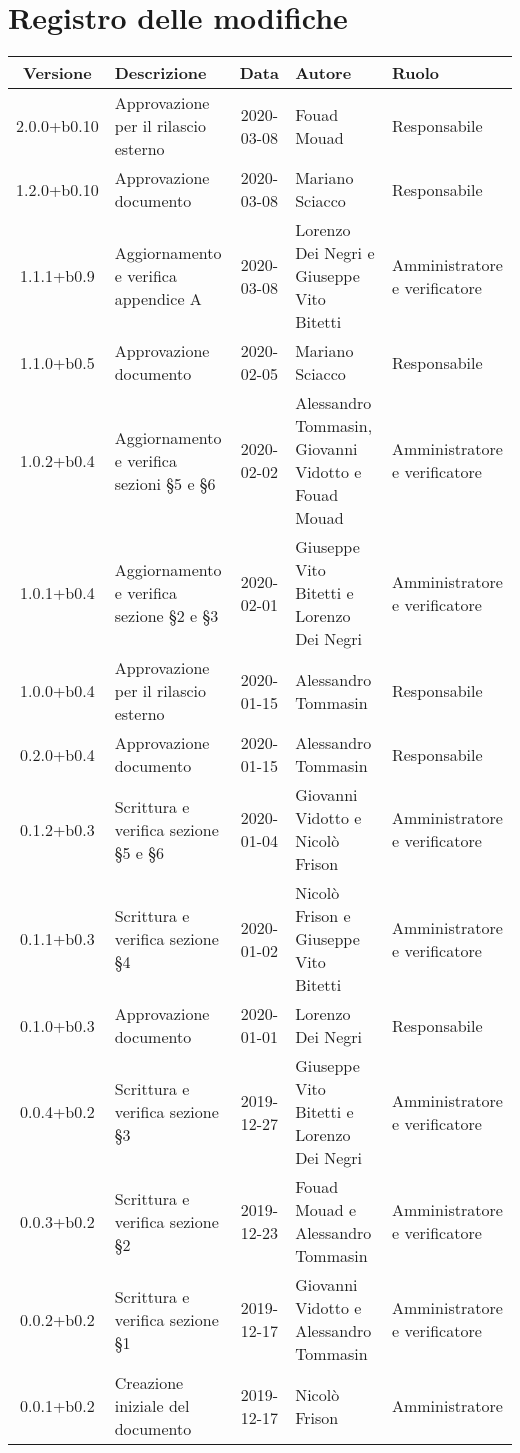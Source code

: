 \section*{Registro delle modifiche}

\begin{center}
	\begin{longtable}{|c|p{3.5cm}|c|p{3cm}|p{3cm}|}
	\hline
	\rowcolor{lighter-grayer}
	\textbf{Versione} & \textbf{Descrizione} & \textbf{Data} & \textbf{Autore} & \textbf{Ruolo} \\
	\hline
	\endfirsthead

	2.0.0+b0.10 & Approvazione per il rilascio esterno  & 2020-03-08 & Fouad Mouad & Responsabile \\
	\hline
	1.2.0+b0.10 & Approvazione documento & 2020-03-08 & Mariano Sciacco & Responsabile \\
	\hline
	1.1.1+b0.9 & Aggiornamento e verifica appendice A  & 2020-03-08 & Lorenzo Dei Negri e Giuseppe Vito Bitetti & Amministratore e verificatore \\
	\hline
	1.1.0+b0.5 & Approvazione documento & 2020-02-05 & Mariano Sciacco & Responsabile \\
	\hline
	1.0.2+b0.4 & Aggiornamento e verifica sezioni \S5 e \S6  & 2020-02-02 & Alessandro Tommasin, Giovanni Vidotto e Fouad Mouad & Amministratore e verificatore \\
	\hline
	1.0.1+b0.4 & Aggiornamento e verifica sezione \S2 e \S3  & 2020-02-01 & Giuseppe Vito Bitetti e Lorenzo Dei Negri & Amministratore e verificatore \\
	\hline
	1.0.0+b0.4 & Approvazione per il rilascio esterno & 2020-01-15 & Alessandro Tommasin & Responsabile \\
	\hline
	0.2.0+b0.4 & Approvazione documento & 2020-01-15 & Alessandro Tommasin & Responsabile \\
	\hline
	0.1.2+b0.3 & Scrittura e verifica sezione \S5 e \S6 & 2020-01-04 & Giovanni Vidotto e Nicolò Frison & Amministratore e verificatore \\
	\hline
	0.1.1+b0.3 &  Scrittura e verifica sezione \S4 & 2020-01-02 & Nicolò Frison e Giuseppe Vito Bitetti & Amministratore e verificatore \\
	\hline
	0.1.0+b0.3 & Approvazione documento & 2020-01-01 & Lorenzo Dei Negri & Responsabile \\
	\hline
	0.0.4+b0.2 & Scrittura e verifica sezione \S3 & 2019-12-27  & Giuseppe Vito Bitetti e Lorenzo Dei Negri & Amministratore e verificatore \\
	\hline
	0.0.3+b0.2 & Scrittura e verifica sezione \S2 & 2019-12-23 & Fouad Mouad e Alessandro Tommasin & Amministratore e verificatore \\
	\hline
	0.0.2+b0.2 & Scrittura e verifica sezione \S1 & 2019-12-17 & Giovanni Vidotto e Alessandro Tommasin & Amministratore e verificatore \\
	\hline
	0.0.1+b0.2 & Creazione iniziale del documento & 2019-12-17 & Nicolò Frison & Amministratore \\
	\hline

	\end{longtable}
\end{center}
